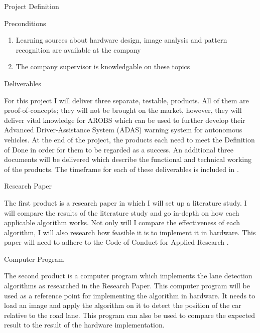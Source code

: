 \documentclass{matthijs}
\begin{document}
\begin{hoofdstuk}{Project Definition}
\begin{paragraaf}{Preconditions}
			\begin{enumerate}

				\item Learning sources about hardware design, image analysis and pattern recognition are available at the company
				\item The company supervisor is knowledgable on these topics

			\end{enumerate}

		\end{paragraaf}

	\end{hoofdstuk}

	\begin{hoofdstuk}{Deliverables}

		For this project I will deliver three separate, testable, products.
		All of them are proof-of-concepts; they will not be brought on the market, however, they will deliver vital knowledge for AROBS which can be used to further develop their Advanced Driver-Assistance System (ADAS) warning system for autonomous vehicles.
		At the end of the project, the products each need to meet the Definition of Done in order for them to be regarded as a success.
		An additional three documents will be delivered which describe the functional and technical working of the products.
		The timeframe for each of these deliverables is included in .

		\begin{paragraaf}{Research Paper}
		
			The first product is a research paper in which I will set up a literature study.
			I will compare the results of the literature study and go in-depth on how each applicable algorithm works.
			Not only will I compare the effectiveness of each algorithm, I will also research how feasible it is to implement it in hardware.
			This paper will need to adhere to the Code of Conduct for Applied Research \cite{andriessen2010gedragscode}.
		
		\end{paragraaf}

		\begin{paragraaf}{Computer Program}
		
			The second product is a computer program which implements the lane detection algorithms as researched in the Research Paper.
			This computer program will be used as a reference point for implementing the algorithm in hardware.
			It needs to load an image and apply the algorithm on it to detect the position of the car relative to the road lane.
			This program can also be used to compare the expected result to the result of the hardware implementation.
		

\end{paragraaf}
\end{hoofdstuk}
\end{document}
